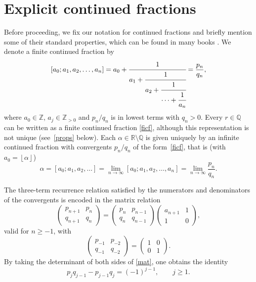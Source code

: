 \documentclass[10pt, a4paper]{amsart}
\numberwithin{equation}{section}
\newcommand\al{{\alpha}}
\theoremstyle{plain}
\theoremstyle{definition}
\newcommand{\Z}{\mathbb{Z}}
\newcommand{\Zp}{\mathbb{Z}_{>0}}
\newcommand{\Q}{\mathbb{Q}}
\newcommand{\R}{\mathbb{R}}
\begin{document}
\section{Explicit continued fractions}

Before proceeding, we fix our notation for continued fractions and briefly mention some of their  
standard properties, which can be found in many books %
\cite{Cas, duverney, Khin}. 
We denote a finite continued fraction by  
\begin{equation}
\label{ficf}
  [a_0;a_1,a_2,\dots,a_n]
  = a_0 + \cfrac{1}{ a_1 + \cfrac{1}{ a_2 + \cfrac{1}{ \cdots +\cfrac{1}{a_n}} } }
  = \frac{p_n}{q_n},
\end{equation}
where  $a_0 \in \Z$, $a_j \in \Zp$  and $p_n/q_n$ is in lowest terms with $q_n>0$. Every $r\in\Q$ 
can be written as a finite continued fraction \eqref{ficf}, although 
this representation is not unique (see~\eqref{props} below). Each $\al\in\R\setminus\Q$ 
is given uniquely by an infinite continued fraction with convergents $p_n/q_n$ 
of the form~\eqref{ficf}, that is (with $a_0=\left \lfloor{\al}\right \rfloor $) 
\begin{equation}
\label{al}
\al = 
  [a_0;a_1,a_2,\dots] = \lim_{n\to\infty} [a_0;a_1,a_2,\dots,a_n] = \lim_{n\to\infty}\frac{p_n}{q_n}.
\end{equation} 

The three-term recurrence relation satisfied by the  numerators and denominators of the convergents 
is encoded in the matrix relation 
\begin{equation}
\label{mat} 
\begin{pmatrix} 
p_{n+1} & p_n \\ 
q_{n+1} & q_n 
\end{pmatrix} 
= \begin{pmatrix}  
p_n &  p_{n-1}\\ 
q_n &  q_{n-1}
\end{pmatrix} 
\begin{pmatrix} 
a_{n+1} & 1 \\ 
1 & 0
\end{pmatrix}, 
\end{equation} 
valid for $n\geq -1$, with
\[  
\begin{pmatrix}  
p_{-1} & p_{-2} \\ 
q_{-1} & q_{-2} 
\end{pmatrix}  
= \begin{pmatrix} 
1 & 0 \\ 
0 & 1
\end{pmatrix}.
\]
By taking the determinant of both sides of \eqref{mat}, one obtains the
identity  
\begin{equation}
\label{detid} 
p_j q_{j-1} - p_{j-1} q_j = (-1)^{j-1}, \qquad j \ge 1. 
\end{equation} 
\end{document}
